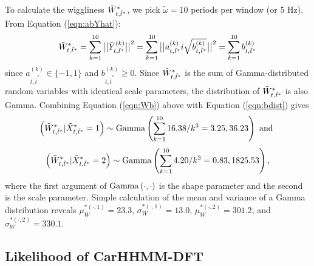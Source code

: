To calculate the wiggliness $\tilde{W}^*_{t,\tilde t^*}$, we pick $\tilde{\omega} = 10$ periods per window (or 5 Hz). From Equation (\ref{eqn:abYhat}):
%
\begin{equation}
    \Ztwo_{t,\tilde t^*} = \sum_{k=1}^{10} \big|\big|\hat{Y}^{(k)}_{t,\tilde t^*}\big|\big|^2 = \sum_{k=1}^{10} \big|\big|a^{(k)}_{t,\tilde t^*}i\sqrt{b^{(k)}_{t,\tilde t^*}}\big|\big|^2 = \sum_{k=1}^{10} b^{(k)}_{t,\tilde t^*}
    \label{eqn:Wb}
\end{equation}
%
since $a^{(k)}_{t,\tilde t^*} \in \{-1,1\}$ and $b^{(k)}_{t,\tilde t^*} \geq 0$. Since $\tilde{W}^*_{t,\tilde t^*}$ is the sum of Gamma-distributed random variables with identical scale parameters, the distribution of $\tilde{W}^*_{t,\tilde t^*}$ is also Gamma. Combining Equation (\ref{eqn:Wb}) above with Equation (\ref{eqn:bdist}) gives
%
$$\left(\tilde{W}^*_{t,\tilde t^*}|\tilde X^*_{t,\tilde t^*} = 1\right) \sim {\rm{Gamma}}\left(\sum_{k=1}^{10} 16.38/k^3 = 3.25 , 36.23 \right) \text { and }$$
%
$$\left(\tilde{W}^*_{t,\tilde t^*}|\tilde X^*_{t,\tilde t^*} = 2\right) \sim {\rm{Gamma}}\left(\sum_{k=1}^{10} 4.20/k^3 = 0.83 , 1825.53 \right),$$
%
where the first argument of ${\rm{Gamma}}\left(\cdot,\cdot\right)$ is the shape parameter and the second is the scale parameter. Simple calculation of the mean and variance of a Gamma distribution reveals $\mu_W^{*(\cdot,1)} = 23.3$, $\sigma_W^{*(\cdot,1)} = 13.0$, $\mu_W^{*(\cdot,2)} = 301.2$, and $\sigma_W^{*(\cdot,2)} = 330.1$.


\subsection{Likelihood of CarHHMM-DFT}

